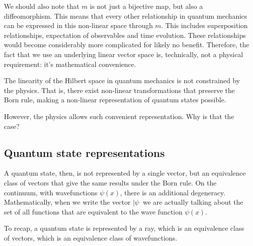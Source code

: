 We should also note that $m$ is not just a bijective map, but also a diffeomorphism. This means that every other relationship in quantum mechanics can be expressed in this non-linear space through $m$. This includes superposition relationships, expectation of observables and time evolution. These relationships would become considerably more complicated for likely no benefit. Therefore, the fact that we use an underlying linear vector space is, technically, not a physical requirement: it's mathematical convenience.

\begin{thrm}
	The linearity of the Hilbert space in quantum mechanics is not constrained by the physics. That is, there exist non-linear transformations that preserve the Born rule, making a non-linear representation of quantum states possible.
\end{thrm}

However, the physics allows such convenient representation. Why is that the case?



\subsection{Quantum state representations}


A quantum state, then, is not represented by a single vector, but an equivalence class of vectors that give the same results under the Born rule. On the continuum, with wavefunctions $\psi(x)$, there is an additional degeneracy.  Mathematically, when we write the vector $|\psi \>$ we are actually talking about the set of all functions that are equivalent to the wave function $\psi(x)$.

  To recap, a quantum state is represented by a ray, which is an equivalence class of vectors, which is an equivalence class of wavefunctions.

